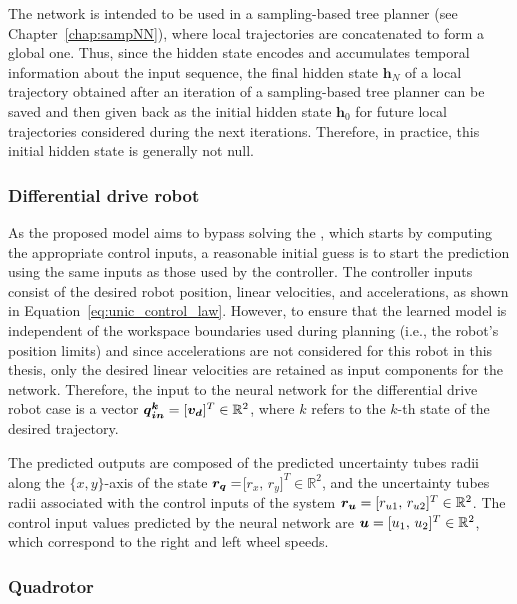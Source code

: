 The network is intended to be used in a sampling-based tree planner (see Chapter~\ref{chap:sampNN}), where local trajectories are concatenated to form a global one. 
Thus, since the hidden state encodes and accumulates temporal information about the input sequence, the final hidden state $\boldsymbol{h}_{N}$ of a local trajectory obtained after an iteration of a sampling-based tree planner can be saved and then given back as the initial hidden state $\boldsymbol{h}_{0}$ for future local trajectories considered during the next iterations. 
Therefore, in practice, this initial hidden state is generally not null.

\subsubsection{Differential drive robot}\label{sec:unic_nn_architecture}

As the proposed model aims to bypass solving the , which starts by computing the appropriate control inputs, a reasonable initial guess is to start the prediction using the same inputs as those used by the controller.
The  controller inputs consist of the desired robot position, linear velocities, and accelerations, as shown in Equation~\ref{eq:unic_control_law}. 
However, to ensure that the learned model is independent of the workspace boundaries used during planning (i.e., the robot's position limits) and since accelerations are not considered for this robot in this thesis, only the desired linear velocities are retained as input components for the network.
Therefore, the input to the neural network for the differential drive robot case is a vector $\boldsymbol{\boldsymbol{q}_{in}^k} = [\boldsymbol{v_d}]^T \in \mathbb{R}^2$, where $k$ refers to the $k$-th state of the desired trajectory.

The predicted outputs are composed of the predicted uncertainty tubes radii along the $\{x,y\}$-axis of the state $\boldsymbol{r_q}=$[$r_{x},\,r_{y}]^T \in \mathbb{R}^2$, and the uncertainty tubes radii associated with the control inputs of the system $\boldsymbol{r_u} = [r_{u1},\,r_{u2}]^T \in \mathbb{R}^2$.
The control input values predicted by the neural network are $\boldsymbol{u} = [u_1 ,\, u_2]^T \in \mathbb{R}^2$, which correspond to the right and left wheel speeds.

\subsubsection{Quadrotor}\label{sec:quad_nn_architecture}

